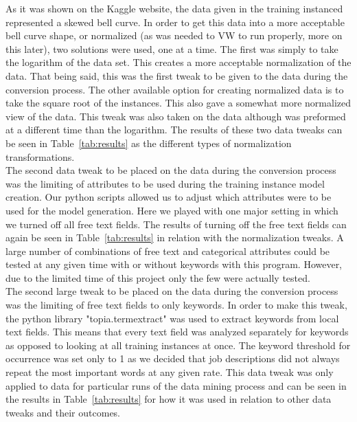 As it was shown on the Kaggle website, the data given in the training instanced represented a skewed bell curve. In order to get
this data into a more acceptable bell curve shape, or normalized (as was needed to VW to run properly, more on this later), two
solutions were used, one at a time. The first was simply to take the logarithm of the data set. This creates a more acceptable
normalization of the data. That being said, this was the first tweak to be given to the data during the conversion process. The other
available option for creating normalized data is to take the square root of the instances. This also gave a somewhat more normalized
view of the data. This tweak was also taken on the data although was preformed at a different time than the logarithm. The results
of these two data tweaks can be seen in Table~\ref{tab:results} as the different types of normalization transformations.\\

The second data tweak to be placed on the data during the conversion process was the limiting of attributes to be used during 
the training instance model creation. Our python scripts allowed us to adjust which attributes were to be used for the model
generation. Here we played with one major setting in which we turned off all free text fields. The results of turning off
the free text fields can again be seen in Table~\ref{tab:results} in relation with the normalization tweaks. A large number of combinations
of free text and categorical attributes could be tested at any given time with or without keywords with this program. However,
due to the limited time of this project only the few were actually tested.\\

The second large tweak to be placed on the data during the conversion process was the limiting of free text fields to only 
keywords. In order to make this tweak, the python library "topia.termextract" was used to extract keywords from local text fields.
This means that every text field was analyzed separately for keywords as opposed to looking at all training instances at once.
The keyword threshold for occurrence was set only to 1 as we decided that job descriptions did not always repeat the most important
words at any given rate. This data tweak was only applied to data for particular runs of the data mining process and can be seen
in the results in Table~\ref{tab:results} for how it was used in relation to other data tweaks and their outcomes.\\

